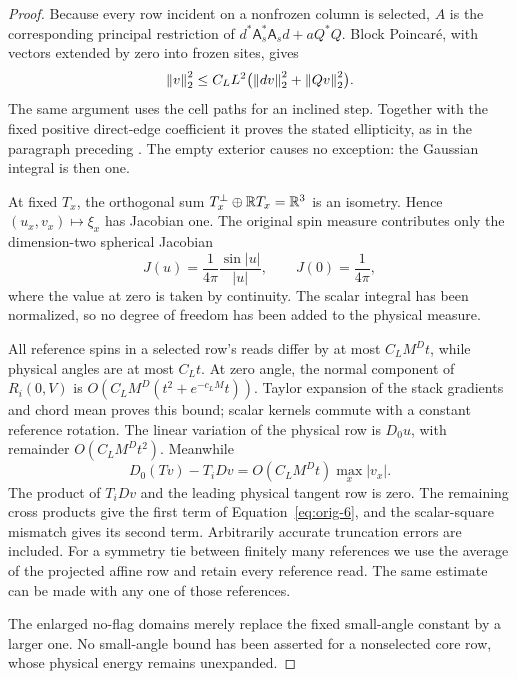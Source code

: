 \begin{proof}
Because every row incident on a nonfrozen column is selected, $A$ is
the corresponding principal restriction of
$d^*\mathsf A_s^*\mathsf A_s d+aQ^*Q$.  Block Poincar\'e, with vectors
extended by zero into frozen sites, gives
\[
 \left\lVert v\right\rVert_2^2\le C_LL^2\bigl(\left\lVert dv\right\rVert_2^2+\left\lVert Qv\right\rVert_2^2\bigr).
\]
The same argument uses the cell paths for an inclined step.  Together
with the fixed positive direct-edge coefficient it proves the stated
ellipticity, as in the paragraph preceding .
The empty exterior causes no exception: the Gaussian integral is then
one.

At fixed $T_x$, the orthogonal sum
$T_x^\perp\oplus\mathbb R T_x=\mathbb R^3$ is an isometry.  Hence $(u_x,v_x)\mapsto
\xi_x$ has Jacobian one.  The original spin measure contributes only the dimension-two spherical
Jacobian
\[
 J(u)=\frac1{4\pi}\frac{\sin|u|}{|u|},\qquad J(0)=\frac1{4\pi},
\]
where the value at zero is taken by continuity.  The scalar integral
has been normalized, so no degree
of freedom has been added to the physical measure.

All reference spins in a selected row's reads differ by at most
$C_LM^Dt$, while physical angles are at most $C_Lt$.  At zero angle,
the normal component of $R_i(0,V)$ is
$O(C_LM^D(t^2+e^{-c_LM}t))$.  Taylor expansion of the stack gradients
and chord mean proves this bound; scalar kernels commute with a
constant reference rotation.  The linear variation of the physical
row is $D_0u$, with remainder $O(C_LM^Dt^2)$.  Meanwhile
\[
 D_0(Tv)-T_iDv=O(C_LM^Dt)\max_x|v_x|.
\]
The product of $T_iDv$ and the leading physical tangent row is zero.
The remaining cross products give the first term of
Equation~\eqref{eq:orig-6}, and the scalar-square mismatch gives its
second term.  Arbitrarily accurate truncation errors are included.
For a symmetry tie between finitely many references we use the average
of the projected affine row and retain every reference read.  The
same estimate can be made with any one of those references.

The enlarged no-flag domains merely replace the fixed small-angle
constant by a larger one.  No small-angle bound has been asserted for
a nonselected core row, whose physical energy remains unexpanded.
\end{proof}

